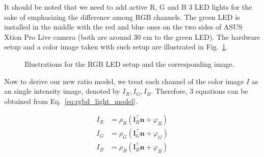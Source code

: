 It should be noted that we need to add active R, G and B 3 LED lights for the sake of emphasizing the difference among RGB channels.
The green LED is installed in the middle with the red and blue ones on the two sides of ASUS Xtion Pro Live camera (both are around 30 cm to the green LED).
The hardware setup and a color image taken with such setup are illustrated in Fig.~\ref{fig:ratio_setup}.

\begin{figure}[!htbp]
\centering
{}
\caption{Illustrations for the RGB LED setup and the corresponding image.}
\label{fig:ratio_setup}
\end{figure}


Now to derive our new ratio model, we treat each channel of the color image $I$ as an single intensity image, denoted by $I_R, I_G, I_B$.
Therefore, 3 equations can be obtained from Eq.~\ref{eq:rgbd_light_model}.

\begin{equation}\label{eq:ratio_prepare}
    \begin{split}
	I_R &= \rho_R(\mathbf{l}_R^\top \mathbf{n} + \varphi_R)\\
	I_G &= \rho_G(\mathbf{l}_G^\top \mathbf{n} + \varphi_G)\\
	I_B &= \rho_B(\mathbf{l}_B^\top \mathbf{n} + \varphi_B)
    \end{split}
\end{equation}

